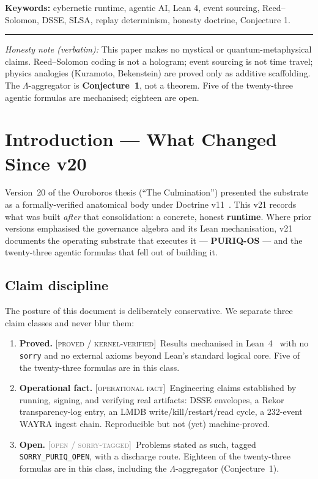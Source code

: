 \documentclass[11pt]{article}
\theoremstyle{plain}
\theoremstyle{definition}
\theoremstyle{remark}
\newcommand{\statusLocked}{\textcolor{szlteal}{\textsc{[proved / kernel-verified]}}}
\newcommand{\statusOpen}{\textcolor{gray}{\textsc{[open / sorry-tagged]}}}
\newcommand{\statusOps}{\textcolor{orange!80!black}{\textsc{[operational fact]}}}
\newcommand{\La}{\Lambda}
\begin{document}
\noindent\textbf{Keywords:} cybernetic runtime, agentic AI, Lean 4, event sourcing,
Reed--Solomon, DSSE, SLSA, replay determinism, honesty doctrine, Conjecture 1.

\vspace{0.5em}\hrule\vspace{0.5em}
\noindent\small\textit{Honesty note (verbatim):} This paper makes no mystical or
quantum-metaphysical claims. Reed--Solomon coding is not a hologram; event sourcing is
not time travel; physics analogies (Kuramoto, Bekenstein) are proved only as additive
scaffolding. The $\La$-aggregator is \textbf{Conjecture~1}, not a theorem. Five of the
twenty-three agentic formulas are mechanised; eighteen are open.\normalsize

\tableofcontents
\newpage

\section{Introduction --- What Changed Since v20}
\label{sec:intro}

Version~20 of the Ouroboros thesis (``The Culmination'') presented the substrate as a
formally-verified anatomical body under Doctrine v11~\cite{lutar2026v20}. This v21 records
what was built \emph{after} that consolidation: a concrete, honest \textbf{runtime}.
Where prior versions emphasised the governance algebra and its Lean mechanisation, v21
documents the operating substrate that executes it --- \textbf{PURIQ-OS} --- and the
twenty-three agentic formulas that fell out of building it.

\subsection{Claim discipline}
The posture of this document is deliberately conservative. We separate three claim
classes and never blur them:
\begin{enumerate}[leftmargin=1.4em]
\item \textbf{Proved.} \statusLocked\ Results mechanised in Lean~4~\cite{lean4} with no
\texttt{sorry} and no external axioms beyond Lean's standard logical core. Five of the
twenty-three formulas are in this class.
\item \textbf{Operational fact.} \statusOps\ Engineering claims established by running,
signing, and verifying real artifacts: DSSE envelopes, a Rekor transparency-log entry, an
LMDB write/kill/restart/read cycle, a 232-event WAYRA ingest chain. Reproducible but not
(yet) machine-proved.
\item \textbf{Open.} \statusOpen\ Problems stated as such, tagged
\texttt{SORRY\_PURIQ\_OPEN}, with a discharge route. Eighteen of the twenty-three
formulas are in this class, including the $\La$-aggregator (Conjecture~1).
\end{enumerate}
\end{document}
